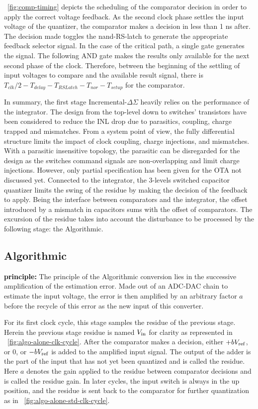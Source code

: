 \figurename~\ref{fig:comp-timing} depicts the scheduling of the comparator decision in order to apply the correct voltage feedback. As the second clock phase settles the input voltage of the quantizer, the comparator makes a decision in less than 1 ns after. The decision made toggles the nand-RS-latch to generate the appropriate feedback selector signal. In the case of the critical path, a single gate generates the signal. The following AND gate makes the results only available for the next second phase of the clock. Therefore, between the beginning of the settling of input voltages to compare and the available result signal, there is \(T_{clk}/2-T_{delay}-T_{RSLatch}-T_{nor}-T_{setup}\) for the comparator.

In summary, the first stage Incremental-$\Delta\Sigma$ heavily relies on the performance of the integrator. The design from the top-level down to switches' transistors have been considered to reduce the INL drop due to parasitics, coupling, charge trapped and mismatches. From a system point of view, the fully differential structure limits the impact of clock coupling, charge injections, and mismatches. With a parasitic insensitive topology, the parasitic can be disregarded for the design as the switches command signals are non-overlapping and limit charge injections. However, only partial specification has been given for the OTA not discussed yet.
Connected to the integrator, the 3-levels switched capacitor quantizer limits the swing of the residue by making the decision of the feedback to apply. Being the interface between comparators and the integrator, the offset introduced by a mismatch in capacitors sums with the offset of comparators. The excursion of the residue takes into account the disturbance to be processed by the following stage: the Algorithmic.
\clearpage

\subsection{Algorithmic}                    %
\textbf{\textcolor{black}{principle:}}
The principle of the Algorithmic conversion lies in the successive amplification of the estimation error. Made out of an ADC-DAC chain to estimate the input voltage, the error is then amplified by an arbitrary factor $a$ before the recycle of this error as the new input of this converter.

For its first clock cycle, this stage samples the residue of the previous stage. Herein the previous stage residue is named \(V_{\rm in}\) for clarity as represented in \figurename~\ref{fig:algo-alone-clk-cycle}. After the comparator makes a decision, either \(+bV_{\rm ref} \), or 0, or \(-bV_{\rm ref} \) is added to the amplified input signal. The output of the adder is the part of the input that has not yet been quantized and is called the residue. Here \(a\) denotes the gain applied to the residue between comparator decisions and is called the residue gain. In later cycles, the input switch is always in the up position, and the residue is sent back to the comparator for further quantization as in \figurename~\ref{fig:algo-alone-std-clk-cycle}.

